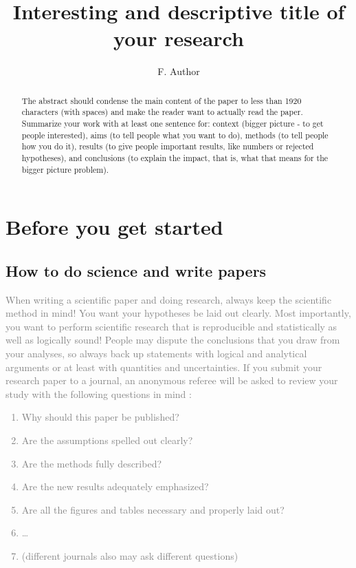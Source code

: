 \documentclass[
  journal=pasa,
  manuscript=Research-Article,
  year=2025,
  volume=X,
]{cup-journal}
\title{Interesting and descriptive title of your research}
\author{F. Author \orcidlink{0000-0000-0000-0000}}
\affiliation{Research School of Astronomy and Astrophysics, Australian National University, Canberra, ACT 2611, Australia}
\newcommand{\comment}[1]{\textcolor{gray}{#1}}
\begin{document}
\begin{abstract}
The abstract should condense the main content of the paper to less than 1920 characters (with spaces) and make the reader want to actually read the paper. Summarize your work with at least one sentence for: context (bigger picture - to get people interested), aims (to tell people what you want to do), methods (to tell people how you do it), results (to give people important results, like numbers or rejected hypotheses), and conclusions (to explain the impact, that is, what that means for the bigger picture problem).
\end{abstract}

\section{Before you get started}

\subsection{How to do science and write papers}

\comment{When writing a scientific paper and doing research, always keep the scientific method in mind! You want your hypotheses be laid out clearly. Most importantly, you want to perform scientific research that is reproducible and statistically as well as logically sound! People may dispute the conclusions that you draw from your analyses, so always back up statements with logical and analytical arguments or at least with quantities and uncertainties. If you submit your research paper to a journal, an anonymous referee will be asked to review your study with the following questions in mind \citep{Bertout2004}:
\begin{enumerate}
    \item Why should this paper be published?
    \item Are the assumptions spelled out clearly?
    \item Are the methods fully described?
    \item Are the new results adequately emphasized?
    \item Are all the figures and tables necessary and properly laid out?
    \item \dots
    \item (different journals also may ask different questions)
\end{enumerate}}
\end{document}
